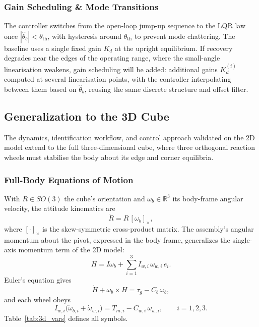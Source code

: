 \subsubsection{Gain Scheduling \& Mode Transitions}

The controller switches from the open-loop jump-up sequence to the LQR law
once $|\hat\theta_b| < \theta_{\text{th}}$, with hysteresis around
$\theta_{\text{th}}$ to prevent mode chattering. The baseline uses a single
fixed gain $K_d$ at the upright equilibrium. If recovery degrades near the
edges of the operating range, where the small-angle linearisation weakens,
gain scheduling will be added: additional gains $K_d^{(i)}$ computed at
several linearisation points, with the controller interpolating between them
based on $\hat\theta_b$, reusing the same discrete structure and offset
filter.

\subsection{Generalization to the 3D Cube}
\label{sec:3dmodel}

The dynamics, identification workflow, and control approach validated on the
2D model extend to the full three-dimensional cube, where three orthogonal
reaction wheels must stabilise the body about its edge and corner equilibria.

\subsubsection{Full-Body Equations of Motion}

With $R\in SO(3)$ the cube's orientation and $\omega_b\in\mathbb{R}^3$ its
body-frame angular velocity, the attitude kinematics are
\begin{equation}
\dot R = R\,[\omega_b]_\times,
\end{equation}
where $[\cdot]_\times$ is the skew-symmetric cross-product matrix. The
assembly's angular momentum about the pivot, expressed in the body frame,
generalizes the single-axis momentum term of the 2D model:
\begin{equation}
H = I\omega_b + \sum_{i=1}^{3} I_{w,i}\,\omega_{w,i}\,e_i.
\end{equation}
Euler's equation gives
\begin{equation}
\dot H + \omega_b \times H = \tau_g - C_b\,\omega_b,
\end{equation}
and each wheel obeys
\begin{equation}
I_{w,i}\big(\dot\omega_{b,i} + \dot\omega_{w,i}\big) = T_{m,i} - C_{w,i}\,\omega_{w,i}, \qquad i=1,2,3.
\end{equation}
Table~\ref{tab:3d_vars} defines all symbols.

